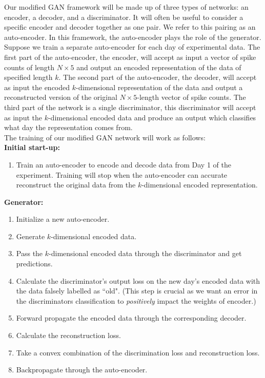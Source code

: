 \documentclass[12pt]{article}
\begin{document}
\indent Our modified GAN framework will be made up of three types of networks: an encoder, a decoder, and a discriminator. It will often be useful to consider a specific encoder and decoder together as one pair. We refer to this pairing as an auto-encoder. In this framework, the auto-encoder plays the role of the generator. Suppose we train a separate auto-encoder for each day of experimental data. The first part of the auto-encoder, the encoder, will accept as input a vector of spike counts of length $N\times 5$ and output an encoded representation of the data of specified length $k$. The second part of the auto-encoder, the decoder, will accept as input the encoded $k$-dimensional representation of the data and output a reconstructed version of the original $N\times 5$-length vector of spike counts. The third part of the network is a single discriminator, this discriminator will accept as input the $k$-dimensional encoded data and produce an output which classifies what day the representation comes from. \\
\indent The training of our modified GAN network will work as follows: \\
\textbf{Initial start-up:}
\begin{enumerate}
  \item Train an auto-encoder to encode and decode data from Day 1 of the experiment. Training will stop when the auto-encoder can accurate reconstruct the original data from the $k$-dimensional encoded representation.
\end{enumerate}
\textbf{Generator:}
\begin{enumerate}
  \item Initialize a new auto-encoder.
  \item Generate $k$-dimensional encoded data.
  \item Pass the $k$-dimensional encoded data through the discriminator and get predictions.
  \item Calculate the discriminator's output loss on the new day's encoded data with the data falsely labelled as ``old". (This step is crucial as we want an error in the discriminators classification to \textit{positively} impact the weights of encoder.)
  \item Forward propagate the encoded data through the corresponding decoder.
  \item Calculate the reconstruction loss.
  \item Take a convex combination of the discrimination loss and reconstruction loss.
  \item Backpropagate through the auto-encoder.
  \end{enumerate}
\end{document}

